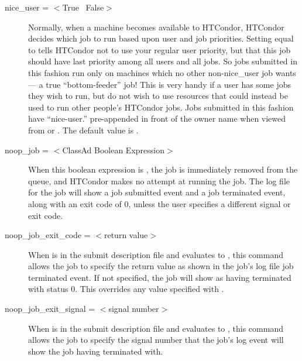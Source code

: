 \begin{description}
\label{man-condor-submit-nice-user}
\item[nice\_user = $<$True \Bar\ False$>$] Normally, when a machine
becomes available to HTCondor, HTCondor decides which job to run based upon
user and job priorities. Setting  equal to 
tells HTCondor not to use your regular user priority, but that this job
should have last priority among all users and all jobs. So jobs
submitted in this fashion run only on machines which no other
non-nice\_user job wants --- a true ``bottom-feeder'' job! This is very
handy if a user has some jobs they wish to run, but do not wish to use
resources that could instead be used to run other people's HTCondor jobs. Jobs
submitted in this fashion have ``nice-user.'' pre-appended in front of
the owner name when viewed from  or .  The
default value is .


\label{man-condor-submit-noop-job}
\item[noop\_job = $<$ClassAd Boolean Expression$>$]
When this boolean expression is ,
the job is immediately removed from the queue,
and HTCondor makes no attempt at running the job.
The log file for the job will show a
job submitted event and a job terminated event,
along with an exit code of 0,
unless the user specifies a different signal or exit code.


\label{man-condor-submit-noop-job-exit-code}
\item[noop\_job\_exit\_code = $<$return value$>$]
When  is in the submit description file
and evaluates to ,
this command allows the job
to specify the return value as shown in the job's log file
job terminated event.
If not specified, the job will show as having terminated with status 0.
This overrides any value specified with .


\label{man-condor-submit-noop-job-exit-signal}
\item[noop\_job\_exit\_signal = $<$signal number$>$]
When  is in the submit description file
and evaluates to ,
this command allows the job
to specify the signal number that the job's log event will show
the job having terminated with.



\end{description}
